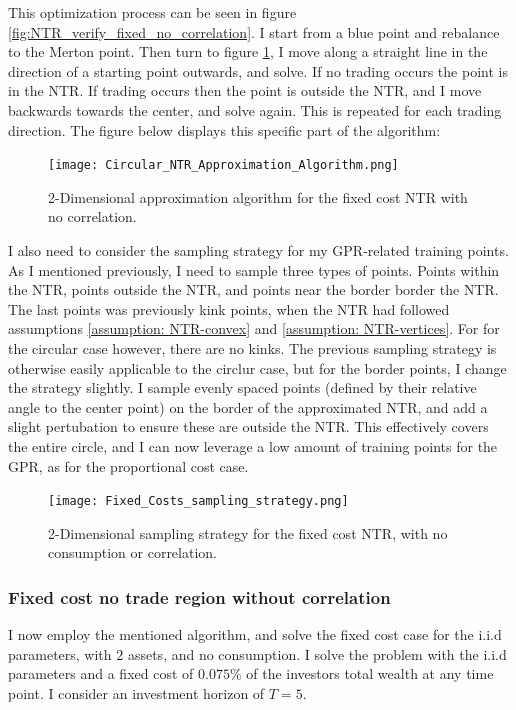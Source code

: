 \documentclass[11pt]{article}
\begin{document}
This optimization process can be seen in figure \ref{fig:NTR_verify_fixed_no_correlation}.
I start from a blue point and rebalance to the Merton point.
Then turn to figure \ref{fig:FixedCost_NTR_Approximation}, I move along a straight line in the direction of a starting point outwards, and solve.
If no trading occurs the point is in the \ac{NTR}. If trading occurs then the point is outside the \ac{NTR}, and I move backwards towards the center, and solve again.
This is repeated for each trading direction. The figure below displays this specific part of the algorithm:
\begin{figure}[!ht]
    \centering
    \texttt{[image: Circular\_NTR\_Approximation\_Algorithm.png]}
    \caption{2-Dimensional approximation algorithm for the fixed cost NTR with no correlation.}
    \label{fig:FixedCost_NTR_Approximation}
\end{figure}
I also need to consider the sampling strategy for my \ac{GPR}-related training points. As I mentioned previously, I need to sample three types of points.
Points within the \ac{NTR}, points outside the \ac{NTR}, and points near the border border the \ac{NTR}. The last points was previously kink points,
when the NTR had followed assumptions \ref{assumption: NTR-convex} and \ref{assumption: NTR-vertices}.
For for the circular case however, there are no kinks.
The previous sampling strategy is otherwise easily applicable to the circlur case, but for the border points, I change the strategy slightly.
I sample evenly spaced points (defined by their relative angle to the center point) on the border of the approximated \ac{NTR}, and add a slight pertubation to ensure these are outside the NTR.
This effectively covers the entire circle, and I can now leverage a low amount of training points for the GPR, as for the proportional cost case.
\begin{figure}[!ht]
    \centering
    \texttt{[image: Fixed\_Costs\_sampling\_strategy.png]}
    \caption{2-Dimensional sampling strategy for the fixed cost NTR, with no consumption or correlation.}
    \label{fig:Sample_Strategy_Fixed}
\end{figure}

\subsubsection{Fixed cost no trade region without correlation} \label{Subsubsection: FixedCostNoCorrelation}
I now employ the mentioned algorithm, and solve the fixed cost case for the i.i.d parameters, with $2$ assets, and no consumption.
I solve the problem with the i.i.d parameters and a fixed cost of $0.075\%$ of the investors total wealth at any time point. 
I consider an investment horizon of $T = 5$.
\end{document}
